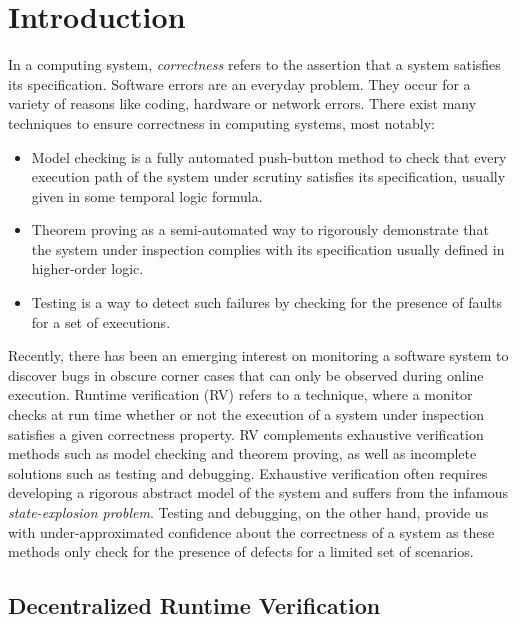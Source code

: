 \chapter{Introduction}
\label{chap:introduction}

In a computing system, {\em correctness} refers to the assertion that a system
satisfies its specification. Software errors are an everyday problem. They 
occur for a variety of reasons like coding, hardware or network errors. There 
exist many techniques to ensure correctness in computing systems, most 
notably:

\begin{itemize}


\item Model checking is a fully automated push-button method to check 
that every execution path of the system under scrutiny satisfies its 
specification, usually given in some temporal logic formula.


\item Theorem proving as a semi-automated way to rigorously demonstrate that 
the system under inspection complies with its specification usually defined in 
higher-order logic.


 \item Testing is a way to detect such failures by checking for the presence of faults for a set of executions.
 

\end{itemize}

Recently, there has been an emerging interest on monitoring a software 
system to discover bugs in obscure corner cases that can only be observed 
during online execution. Runtime verification (RV) refers to a technique,  
where a monitor checks at run time whether or not the execution of a system 
under inspection satisfies a given correctness property. RV complements  
exhaustive verification methods such as model checking and theorem proving, as
well as incomplete solutions such as testing and debugging. Exhaustive 
verification often requires developing a rigorous abstract model of the 
system and suffers from the infamous {\em state-explosion problem}. Testing  
and debugging, on the other hand, provide us with under-approximated confidence 
about the correctness of a system as these methods only check for the presence 
of defects for a limited set of scenarios.

\section{Decentralized Runtime Verification}

